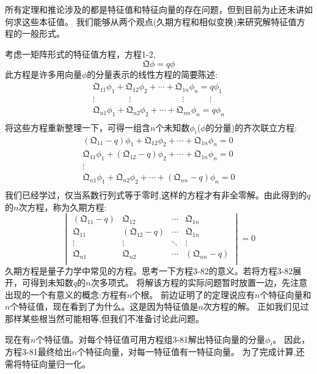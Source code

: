所有定理和推论涉及的都是特征值和特征向量的存在问题，但到目前为止还未讲如何求这些本征值。
我们能够从两个观点(久期方程和相似变换)来研究解特征值方程的一般形式。

考虑一矩阵形式的特征值方程，方程1-2,
\[\mathfrak{Q}\phi=q\phi \tag{3-79}\]
此方程是许多用向量$\phi$的分量表示的线性方程的简要陈述:
\[
\begin{array}{c}
    \mathfrak{Q}_{11}\phi_1+\mathfrak{Q}_{12}\phi_2+ \cdots +\mathfrak{Q}_{1n}\phi_n=q\phi_1 \\
    \vdots \qquad \qquad \vdots \qquad \qquad \qquad \vdots \quad \qquad \vdots \\
    \mathfrak{Q}_{n1}\phi_1+\mathfrak{Q}_{n2}\phi_2+ \cdots +\mathfrak{Q}_{nn}\phi_n=q\phi_n \\
\end{array}    
\tag{3-80}
\]
将这些方程重新整理一下，可得一组含$n$个未知数$\phi_i$($\phi$的分量)的齐次联立方程:
\[
\begin{array}{c}
    (\mathfrak{Q}_{11}-q)\phi_1+\mathfrak{Q}_{12}\phi_2+ \cdots +\mathfrak{Q}_{1n}\phi_n=0 \\
    \mathfrak{Q}_{11}\phi_1+(\mathfrak{Q}_{12}-q)\phi_2+ \cdots +\mathfrak{Q}_{1n}\phi_n=0 \\
    \vdots \\
    \mathfrak{Q}_{n1}\phi_1+\mathfrak{Q}_{n2}\phi_2+ \cdots +(\mathfrak{Q}_{nn}-q)\phi_n=0 \\
\end{array}  
\tag{3-81}  
\]
我们已经学过，仅当系数行列式等于零时,这样的方程才有非全零解。由此得到的$q$的$n$次方程，称为久期方程:
\[
\begin{vmatrix}
    (\mathfrak{Q}_{11}-q) & \mathfrak{Q}_{12} & \cdots & \mathfrak{Q}_{1n} \\
    \mathfrak{Q}_{11} & (\mathfrak{Q}_{12}-q) & \cdots & \mathfrak{Q}_{1n} \\
    \vdots  & \vdots & \ddots  & \vdots \\
    \mathfrak{Q}_{n1} & \mathfrak{Q}_{n2} & \cdots & (\mathfrak{Q}_{nn}-q) \\
\end{vmatrix}    
=0 \tag{3-82}
\]
久期方程是量子力学中常见的方程。思考一下方程3-82的意义。若将方程3-82展开，可得到未知数$q$的$n$次多项式。
将解该方程的实际问题暂时放置一边，先注意出现的一个有意义的概念:方程有$n$个根。
前边证明了的定理说应有$n$个特征向量和$n$个特征值，现在看到了为什么。这是因为特征值是$n$次方程的解。
正如我们见过那样某些根当然可能相等,但我们不准备讨论此问题。

现在有$n$个特征值。对每个特征值可用方程组3-81解出特征向量的分量$\phi_i$。
因此，方程3-81最终给出$n$个特征向量，对每一特征值有一特征向量。
为了完成计算,还需将特征向量归一化。

